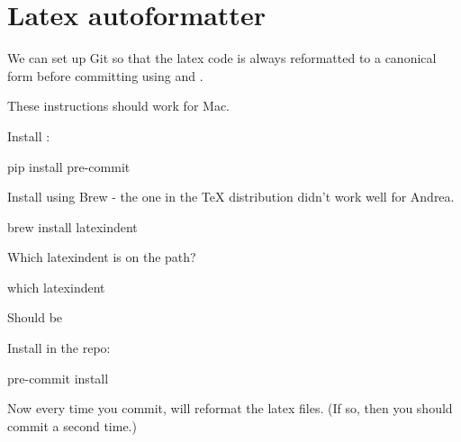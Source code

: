 
\section{Latex autoformatter}

We can set up Git so that the latex code is always reformatted to a canonical form before committing using  and .

These instructions should work for Mac.

Install :
%
\begin{console}
    pip install pre-commit
\end{console}
%

Install  using Brew - the one in the TeX distribution didn't work well for Andrea.
%
\begin{console}
    brew install latexindent
\end{console}
%
Which latexindent is on the path?
%
\begin{console}
    which latexindent
\end{console}
%
Should be 

Install  in the repo:
%
\begin{console}
    pre-commit install
\end{console}
%
Now every time you commit,  will reformat the latex files.
(If so, then you should commit a second time.)
